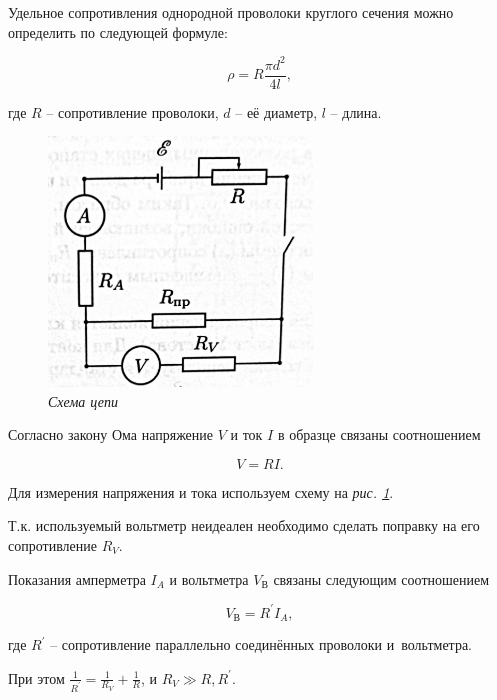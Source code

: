 \documentclass[a4paper,12pt]{article} %
\begin{document}
Удельное сопротивления однородной проволоки круглого сечения можно определить по следующей формуле:

\begin{equation}\label{1form}
\rho = R \frac{\pi d^2}{4l},
\end{equation}

\noindent где $R$ -- сопротивление проволоки, $d$ -- её диаметр, $l$ -- длина.

\medskip

\begin{figure}
	\includegraphics[width=7cm]{scheme.jpg}
	\caption{\textit{Схема цепи}}
	\label{fig:image}
\end{figure}

Согласно закону Ома напряжение $V$ и ток $I$ в образце связаны соотношением

\begin{equation}
V = RI.
\end{equation}

Для измерения напряжения и тока используем схему на \textit{рис.  \ref{fig:image}}.

\medskip

Т.к. используемый вольтметр неидеален необходимо сделать поправку на его сопротивление $R_V$.

\medskip

Показания амперметра $I_A$ и вольтметра $V_\text{В}$ связаны следующим соотношением

\begin{equation}
V_\text{В}=R^\prime I_A,
\end{equation}

\noindent где $R^\prime$ -- сопротивление параллельно соединённых проволоки и~вольтметра.

\medskip

При этом $\frac{1}{R^\prime} = \frac{1}{R_V} + \frac{1}{R}$, и $R_V \gg R, R^\prime$.\\
\end{document}
